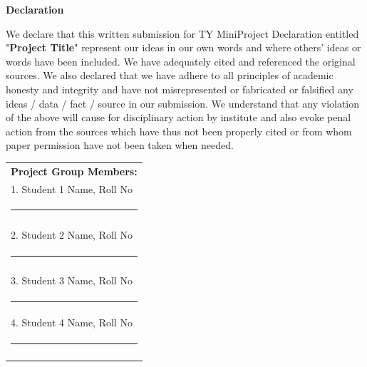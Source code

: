 
\begin{centering}
\large
{\LARGE\bf Declaration}\\
\end{centering}

\justify
We declare that this written submission for TY MiniProject Declaration entitled "{\bf Project Title}" represent our ideas in our own words and where others' ideas or words have been included. We have adequately cited and referenced the original sources. We also declared that we have adhere to all principles of academic honesty and integrity and have not misrepresented or fabricated or falsified any ideas / data / fact / source in our submission. We understand that any violation of the above will cause for disciplinary action by institute and also evoke penal action from the sources which have thus not been properly cited or from whom paper permission have not been taken when needed.  \\ 

\vspace{3cm}
\hfill%
\begin{tabular}[t]{l@{}}
\vspace{1cm}

{\textbf{Project Group Members:}} \\ 
\vspace{1cm}

1. Student 1 Name, Roll No \\
\noindent\rule{5cm}{0.10pt} \\
\\
\vspace{1cm}

2. Student 2 Name, Roll No \\
\noindent\rule{5cm}{0.10pt} \\
\\
\vspace{1cm}

3. Student 3 Name, Roll No \\
 \noindent\rule{5cm}{0.10pt}
\\
\vspace{1cm}

4. Student 4 Name, Roll No \\
 \noindent\rule{5cm}{0.10pt}
\\
\vspace{1cm}
\end{tabular}

